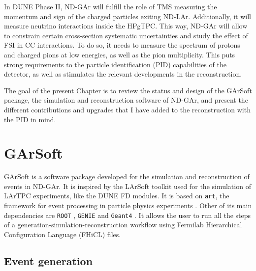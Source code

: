 In DUNE Phase II, ND-GAr will fulfill the role of TMS measuring the momentum and sign of the charged particles exiting ND-LAr. Additionally, it will measure neutrino interactions inside the HPgTPC. This way, ND-GAr will allow to constrain certain cross-section systematic uncertainties and study the effect of FSI in CC interactions. To do so, it needs to measure the spectrum of protons and charged pions at low energies, as well as the pion multiplicity. This puts strong requirements to the particle identification (PID) capabilities of the detector, as well as stimulates the relevant developments in the reconstruction.

The goal of the present Chapter is to review the status and design of the GArSoft package, the simulation and reconstruction software of ND-GAr, and present the different contributions and upgrades that I have added to the reconstruction with the PID in mind.

\section{GArSoft}\label{section:garsoft}

GArSoft is a software package developed for the simulation and reconstruction of events in ND-GAr. It is inspired by the LArSoft toolkit \cite{Church2013} used for the simulation of LArTPC experiments, like the DUNE FD modules. It is based on \texttt{art}, the framework for event processing in particle physics experiments \cite{ART}. Other of its main dependencies are \texttt{ROOT} \cite{Brun1997}, \texttt{GENIE} \cite{Andreopoulos2009} and \texttt{Geant4} \cite{GEANT42002}. It allows the user to run all the steps of a generation-simulation-reconstruction workflow using Fermilab Hierarchical Configuration Language (FHiCL) files.

\subsection{Event generation}

